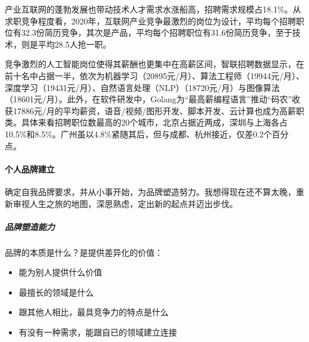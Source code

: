 \documentclass[letterpaper,10pt,english]{sphinxmanual}
\begin{document}
产业互联网的蓬勃发展也带动技术人才需求水涨船高，招聘需求规模占18.1\%。从求职竞争程度看，2020年，互联网产业竞争最激烈的岗位为设计，平均每个招聘职位有32.3份简历竞争，其次是产品，平均每个招聘职位有31.6份简历竞争，至于技术，则是平均28.5人抢一职。

竞争激烈的人工智能岗位使得其薪酬也更集中在高薪区间，智联招聘数据显示，在前十名中占据一半，依次为机器学习（20895元/月）、算法工程师（19944元/月）、深度学习（19431元/月）、自然语言处理（NLP）（18720元/月）与图像算法（18601元/月）。此外，在软件研发中，Golang为“最高薪编程语言”推动“码农”收获17886元/月的平均薪资，语音/视频/图形开发、脚本开发、云计算也成为高薪职类。具体来看招聘职位数最高的20个城市，北京占据近两成，深圳与上海各占10.5\%和8.5\%。广州虽以4.8\%紧随其后，但与成都、杭州接近，仅差0.2个百分点。


\paragraph{个人品牌建立}
\label{\detokenize{chapter_project/AI_talents:id11}}
确定自我品牌要求，并从小事开始，为品牌塑造努力。我想得现在还不算太晚，重新审视人生之旅的地图，深思熟虑，定出新的起点并迈出步伐。


\subparagraph{品牌塑造能力}
\label{\detokenize{chapter_project/AI_talents:id12}}
品牌的本质是什么？是提供差异化的价值：%
\begin{footnote}[746]\sphinxAtStartFootnote
{}
%
\end{footnote}
\begin{itemize}
\item {} 
能为别人提供什么价值

\item {} 
最擅长的领域是什么

\item {} 
跟其他人相比，最具竞争力的特点是什么

\item {} 
有没有一种需求，能跟自已的领域建立连接

\end{itemize}
\end{document}
